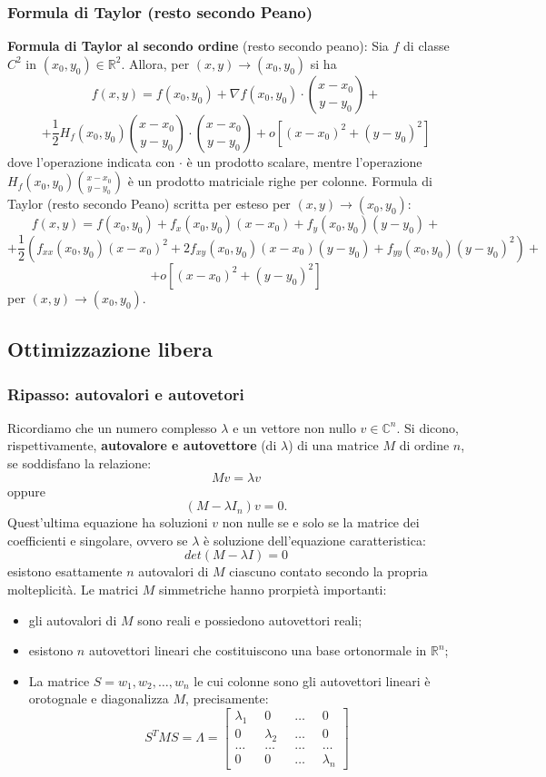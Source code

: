 \subsubsection{Formula di Taylor (resto secondo Peano)}
\textbf{Formula di Taylor al secondo ordine} (resto secondo peano):\newline
Sia $f$ di classe $C^2$ in $(x_0,y_0) \in \mathbb{R}^2$. Allora, per $(x,y) \rightarrow  (x_0, y_0)$ si ha 
\[
    f(x,y) = f(x_0,y_0) + \nabla f(x_0,y_0) \cdot \binom{x-x_0}{y-y_0} + 
\]
\[
    +\frac{1}{2} H_f(x_0,y_0) \binom{x-x_0}{y-y_0} \cdot \binom{x-x_0}{y-y_0} + o[(x-x_0)^2 + (y-y_0)^2]
\]
dove l'operazione indicata con $\cdot $ è un prodotto scalare, mentre l'operazione $H_f(x_0,y_0) \binom{x-x_0}{y-y_0}$ è un prodotto matriciale righe per colonne.
\newline
\newline
Formula di Taylor (resto secondo Peano) scritta per esteso per $(x,y) \rightarrow  (x_0,y_0)$:
\[
    f(x,y) = f(x_0, y_0) + f_x(x_0,y_0)(x-x_0) + f_y(x_0,y_0)(y-y_0) +
\]
\[
    + \frac{1}{2}\left( f_{xx}(x_0,y_0)(x-x_0)^2 + 2f_{xy}(x_0,y_0)(x-x_0)(y-y_0) + f_{yy}(x_0,y_0)(y-y_0)^2 \right) +
\]
\[
    + o[(x-x_0)^2 + (y-y_0)^2]
\]
per $(x,y) \rightarrow (x_0,y_0)$.
\subsection{Ottimizzazione libera}
\subsubsection{Ripasso: autovalori e autovetori}
Ricordiamo che un numero complesso $\lambda$ e un vettore non nullo $v \in \mathbb{C}^n$. Si dicono, rispettivamente, \textbf{autovalore e autovettore} (di $\lambda$) di una matrice $M$ di ordine $n$, se soddisfano la relazione:
\[
    Mv = \lambda v
\]
oppure
\[
    (M-\lambda I_n)v = 0.
\]
Quest'ultima equazione ha soluzioni $v$ non nulle se e solo se la matrice dei coefficienti e singolare, ovvero se $\lambda$ è soluzione dell'equazione caratteristica:
\[
    det(M-\lambda I) = 0
\]
esistono esattamente $n$ autovalori di $M$ ciascuno contato secondo la propria molteplicità.\newline
Le matrici $M$ simmetriche hanno prorpietà importanti:
\begin{itemize}
    \item gli autovalori di $M$ sono reali e possiedono autovettori reali;
    \item esistono $n$ autovettori lineari che costituiscono una base ortonormale in $\mathbb{R}^n$;
    \item La matrice $S = {w_1, w_2, \dots, w_n}$ le cui colonne sono gli autovettori lineari è orotognale e diagonalizza $M$, precisamente:
    \[
        S^TMS = \Lambda = \left[\begin{matrix}
            \lambda_1 \;\; &0 \;\; &\dots \;\; &0\\
            0 \;\; &\lambda_2 \;\; &\dots \;\; &0\\
            \dots \;\; &\dots \;\; &\dots \;\; &\dots\\
            0 \;\; &0 \;\; &\dots \;\; &\lambda_n
        \end{matrix}\right]
    \]
\end{itemize}
